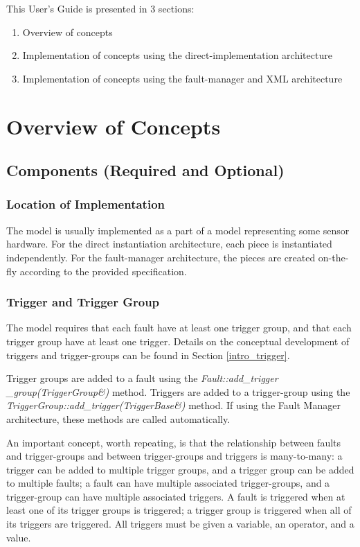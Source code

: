\documentclass[11pt,fleqn]{report}
\begin{document}
This User's Guide is presented in 3 sections:
\begin{enumerate}
 \item Overview of concepts
 \item Implementation of concepts using the direct-implementation architecture
 \item Implementation of concepts using the fault-manager and XML architecture
\end{enumerate}


\section {Overview of Concepts}
\subsection{Components (Required and Optional)}
\subsubsection{Location of Implementation}
The model is usually implemented as a part of a model representing some sensor
hardware. For the direct instantiation architecture, each piece is instantiated
independently. For the fault-manager architecture, the pieces are created
on-the-fly according to the provided specification.

\subsubsection{ Trigger and Trigger Group}
The model requires that each fault have at least one trigger group, and that
each trigger group have at least one trigger. Details on the conceptual
development of triggers and trigger-groups can be found in Section
\ref{intro_trigger}.

Trigger groups are added to a fault using the \textit{Fault::add\_trigger
\_group(TriggerGroup\&)} method.
Triggers are added to a trigger-group using the
\textit{TriggerGroup::add\_trigger(TriggerBase\&)} method.
If using the Fault Manager architecture, these methods are called automatically.

An important concept, worth repeating, is that the relationship between
faults and
trigger-groups and between trigger-groups and triggers is many-to-many:
a trigger can be added to multiple trigger groups, and a trigger group can be
added to multiple faults; a fault can have multiple associated trigger-groups,
and a trigger-group can have multiple associated triggers. A fault is triggered
when at least one of its trigger groups is triggered; a
trigger group is triggered when all of its triggers are triggered.
All triggers must be given a variable, an operator, and a value.
\end{document}
